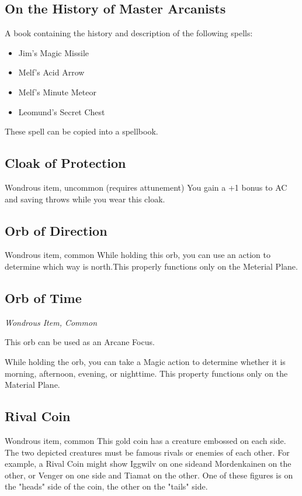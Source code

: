 \documentclass[letterpaper,openany,oneside,twocolumn]{book}
\begin{document}
\subsection*{On the History of Master Arcanists}
A book containing the history and description of the following spells:
\begin{itemize}
    \item Jim's Magic Missile
    \item Melf's Acid Arrow
    \item Melf's Minute Meteor
    \item Leomund's Secret Chest
\end{itemize}
These spell can be copied into a spellbook.

\subsection*{Cloak of Protection}
Wondrous item, uncommon (requires attunement)
You gain a +1 bonus to AC and saving throws while you wear this cloak.

\subsection*{Orb of Direction}
Wondrous item, common
While holding this orb, you can use an action to determine which way is north.This properly functions only on the Meterial Plane.

\subsection*{Orb of Time}
\textit{Wondrous Item, Common}\\
{\entryfont This orb can be used as an Arcane Focus.

While holding the orb, you can take a Magic action to determine whether it is morning, afternoon, evening, or nighttime. This property functions only on the Material Plane.}

\subsection*{Rival Coin}
Wondrous item, common
This gold coin has a creature embossed on each side.
The two depicted creatures must be famous rivals or enemies of each other.
For example, a Rival Coin might show Iggwilv on one sideand Mordenkainen on the other, or Venger on one side and Tiamat on the other.
One of these figures is on the "heads" side of the coin, the other on the "tails" side.
\end{document}
